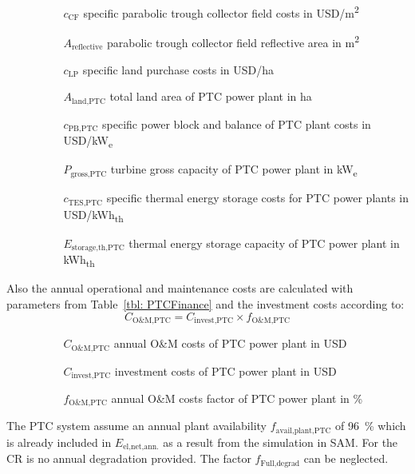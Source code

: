 \begin{itemize}
\item[ ] 
\begin{itemize}
\item[ ] 
\begin{itemize}
\item[$c_{\text{CF}}$]specific parabolic trough collector field costs in USD/m\textsuperscript{2}
\item[$A_{\text{reflective}}$]parabolic trough collector field reflective area in m\textsuperscript{2}
\item[$c_{\text{LP}}$]specific land purchase costs in USD/ha
\item[$A_{\text{land,PTC}}$]total land area of PTC power plant in ha
\item[$c_{\text{PB,PTC}}$]specific power block and balance of PTC plant costs in USD/kW\textsubscript{e}
\item[$P_{\text{gross,PTC}}$]turbine gross capacity of PTC power plant in kW\textsubscript{e}
\item[$c_{\text{TES,PTC}}$]specific thermal energy storage costs for PTC power plants in USD/kWh\textsubscript{th}
\item[$E_{\text{storage,th,PTC}}$]thermal energy storage capacity of PTC power plant in kWh\textsubscript{th}
\end{itemize}
\end{itemize}
\end{itemize}
Also the annual operational and maintenance costs are calculated with parameters from Table~\ref{tbl: PTCFinance} and the investment costs according to:
\begin{equation}
C_{\text{O\&M,PTC}} = C_{\text{invest,PTC}} \times f_{\text{O\&M,PTC}}
\end{equation} 
\begin{itemize}
\item[ ] 
\begin{itemize}
\item[ ] 
\begin{itemize}
\item[$C_{\text{O\&M,PTC}}$]annual O\&M costs of PTC power plant in USD
\item[$C_{\text{invest,PTC}}$]investment costs of PTC power plant in USD
\item[$f_{\text{O\&M,PTC}}$]annual O\&M costs factor of PTC power plant in \%
\end{itemize}
\end{itemize}
\end{itemize}
The PTC system assume an annual plant availability $f_{\text{avail,plant,PTC}}$ of 96~\% which is already included in $E_{\text{el,net,ann.}}$ as a result from the simulation in SAM. For the CR is no annual degradation provided. The factor $f_{\text{Full,degrad}}$ can be neglected.
\pagebreak
